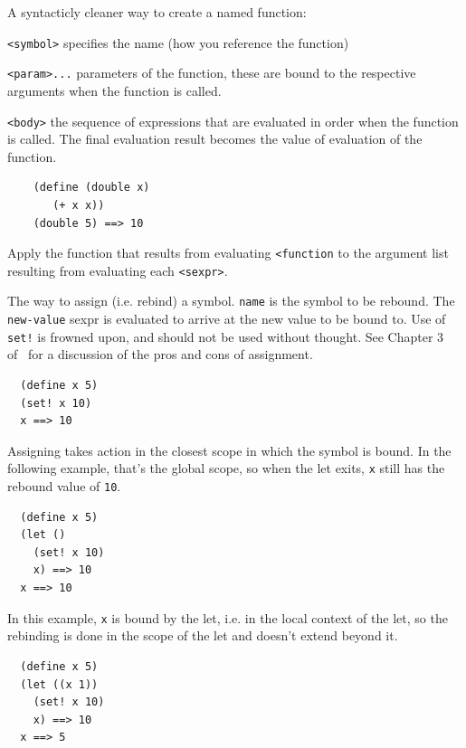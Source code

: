 \documentclass[12pt]{article}
\begin{document}

A syntacticly cleaner way to create a named function:

\verb|<symbol>| specifies the name (how you reference the function)

\verb|<param>...| parameters of the function, these are bound to the
respective arguments when the function is called.

\verb|<body>| the sequence of expressions that are evaluated in order
when the function is called. The final evaluation result becomes the
value of evaluation of the function.

\begin{verbatim}
    (define (double x)
       (+ x x))
    (double 5) ==> 10
\end{verbatim}


Apply the function that results from evaluating \verb|<function| to
the argument list resulting from evaluating each \verb|<sexpr>|.


The way to assign (i.e. rebind) a symbol. \verb|name| is the symbol to
be rebound. The \verb|new-value| sexpr is evaluated to arrive at the
new value to be bound to. Use of \verb|set!| is frowned upon, and
should not be used without thought.  See Chapter 3
of~\cite{Abelson85Structure} for a discussion of the pros and cons of
assignment.

\begin{verbatim}
  (define x 5)
  (set! x 10)
  x ==> 10
\end{verbatim}

Assigning takes action in the closest scope in which the symbol is
bound. In the following example, that's the global scope, so when the
let exits, \verb|x| still has the rebound value of \verb|10|.

\begin{verbatim}
  (define x 5)
  (let ()
    (set! x 10)
    x) ==> 10
  x ==> 10
\end{verbatim}

In this example, \verb|x| is bound by the let, i.e. in the local
context of the let, so the rebinding is done in the scope of the let
and doesn't extend beyond it.

\begin{verbatim}
  (define x 5)
  (let ((x 1))
    (set! x 10)
    x) ==> 10
  x ==> 5
\end{verbatim}
\end{document}
